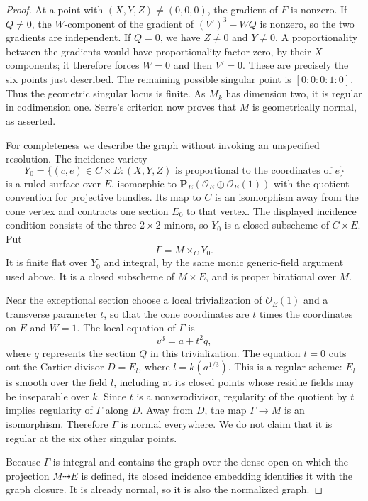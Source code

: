 \begin{proof}
At a point with $(X,Y,Z)\ne(0,0,0)$, the gradient of $F$ is
nonzero.  If $Q\ne0$, the $W$-component of the gradient of
$(V')^3-WQ$ is nonzero, so the two gradients are independent.
If $Q=0$, we have $Z\ne0$ and $Y\ne0$.  A proportionality
between the gradients would have proportionality factor zero,
by their $X$-components; it therefore forces $W=0$ and then
$V'=0$.  These are precisely the six points just described.
The remaining possible singular point is
$[0:0:0:1:0]$.  Thus the geometric singular locus is finite.
As $M_{\bar k}$ has dimension two, it is regular in codimension
one.  Serre's criterion now proves that $M$ is geometrically
normal, as asserted.

For completeness we describe the graph without invoking an
unspecified resolution.  The incidence variety
\[
 Y_0=\{(c,e)\in C\times E:
              (X,Y,Z)\text{ is proportional to the coordinates of }e\}
\]
is a ruled surface over $E$, isomorphic to
$\mathbf P_E(\mathcal O_E\oplus\mathcal O_E(1))$
with the quotient convention for projective bundles.  Its map to
$C$ is an isomorphism away from the cone vertex and contracts
one section $E_0$ to that vertex.  The displayed incidence
condition consists of the three $2\times2$ minors, so $Y_0$
is a closed subscheme of $C\times E$.
Put
\[
                         \Gamma=M\times_CY_0.
\]
It is finite flat over $Y_0$ and integral, by the same monic
generic-field argument used above.  It is a closed subscheme
of $M\times E$, and is proper birational over $M$.

Near the exceptional section choose a local trivialization of
$\mathcal O_E(1)$ and a transverse parameter $t$, so that the
cone coordinates are $t$ times the coordinates on $E$ and
$W=1$.  The local equation of $\Gamma$ is
\[
                         v^3=a+t^2q,
                         \tag{B.2.8}
\]
where $q$ represents the section $Q$ in this trivialization.
The equation $t=0$ cuts out the Cartier divisor
$D=E_l$, where $l=k(a^{1/3})$.  This is a regular scheme:
$E_l$ is smooth over the field $l$, including at its closed
points whose residue fields may be inseparable over $k$.
Since $t$ is a nonzerodivisor, regularity of the quotient by
$t$ implies regularity of $\Gamma$ along $D$.  Away from $D$,
the map $\Gamma\to M$ is an isomorphism.  Therefore $\Gamma$
is normal everywhere.  We do not claim that it is regular
at the six other singular points.

Because $\Gamma$ is integral and contains the graph over the
dense open on which the projection $M\dashrightarrow E$ is
defined, its closed incidence embedding identifies it with
the graph closure.  It is already normal, so it is also the
normalized graph.


\end{proof}
